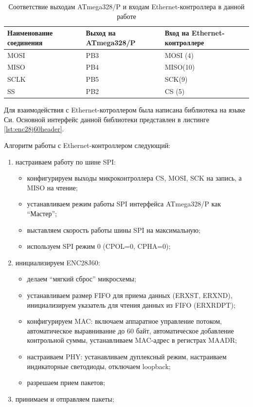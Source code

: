 \begin{table}[h!]
\caption{Соответствие выходам ATmega328/P и входам Ethernet-контроллера в данной работе}
\label{connection}
	\begin{tabular}{|p{40mm}|p{40mm}|p{40mm}|}
\hline
	Наименование соединения & Выход на ATmega328/P & Вход на Ethernet-контроллере \\
\hline
		MOSI & PB3 & MOSI (4)\\
\hline
		MISO & PB4 & MISO(10)\\
\hline
		SCLK & PB5 & SCK(9)\\
\hline
		SS & PB2 & CS (5)\\
\hline
\end{tabular}
\end{table}

Для взаимодействия с Ethernet-котроллером была написана библиотека на языке Си. Основной интерфейс данной библиотеки представлен в листинге \ref{lst:enc28j60header}. 

{\small{}}

Алгоритм работы с Ethernet-контроллером следующий:
\begin{enumerate}
	\item настраиваем работу по шине SPI: 
		\begin{itemize}
			\item конфигурируем выходы микроконтроллера CS, MOSI, SCK на запись, а MISO на чтение;
			\item устанавливаем режим работы SPI интерфейса ATmega328/P как ``Мастер'';
			\item выставляем скорость работы шины SPI на максимальную;
			\item используем SPI режим 0 (CPOL=0, CPHA=0);
		\end{itemize}
	\item инициализируем ENC28J60:
		\begin{itemize}
			\item делаем ``мягкий сброс'' микросхемы;
			\item устанавливаем размер FIFO для приема данных (ERXST, ERXND), инициализируем указатель для чтения данных из FIFO (ERXRDPT);
			\item конфигурируем MAC: включаем аппаратное управление потоком, автоматическое выравнивание до 60 байт, автоматическое добавление контрольной суммы, устанавливаем MAC-адрес в регистрах MAADR;
			\item настраиваем PHY: устанавливаем дуплексный режим, настраиваем индикаторные светодиоды, отключаем loopback;
			\item разрешаем прием пакетов;
		\end{itemize}
	\item принимаем и отправляем пакеты;
\end{enumerate}

